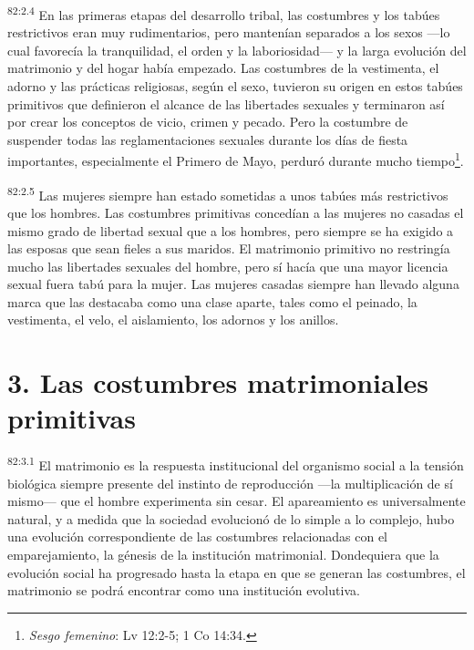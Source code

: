\documentclass[twoside, 11pt]{book}
\begin{document}
\par
\textsuperscript{82:2.4} En las primeras etapas del desarrollo tribal, las costumbres y los tabúes restrictivos eran muy rudimentarios, pero mantenían separados a los sexos ---lo cual favorecía la tranquilidad, el orden y la laboriosidad--- y la larga evolución del matrimonio y del hogar había empezado. Las costumbres de la vestimenta, el adorno y las prácticas religiosas, según el sexo, tuvieron su origen en estos tabúes primitivos que definieron el alcance de las libertades sexuales y terminaron así por crear los conceptos de vicio, crimen y pecado. Pero la costumbre de suspender todas las reglamentaciones sexuales durante los días de fiesta importantes, especialmente el Primero de Mayo, perduró durante mucho tiempo\footnote{\textit{Sesgo femenino}: Lv 12:2-5; 1 Co 14:34.}.

\par
\textsuperscript{82:2.5} Las mujeres siempre han estado sometidas a unos tabúes más restrictivos que los hombres. Las costumbres primitivas concedían a las mujeres no casadas el mismo grado de libertad sexual que a los hombres, pero siempre se ha exigido a las esposas que sean fieles a sus maridos. El matrimonio primitivo no restringía mucho las libertades sexuales del hombre, pero sí hacía que una mayor licencia sexual fuera tabú para la mujer. Las mujeres casadas siempre han llevado alguna marca que las destacaba como una clase aparte, tales como el peinado, la vestimenta, el velo, el aislamiento, los adornos y los anillos.

\section*{3. Las costumbres matrimoniales primitivas}
\par
\textsuperscript{82:3.1} El matrimonio es la respuesta institucional del organismo social a la tensión biológica siempre presente del instinto de reproducción ---la multiplicación de sí mismo--- que el hombre experimenta sin cesar. El apareamiento es universalmente natural, y a medida que la sociedad evolucionó de lo simple a lo complejo, hubo una evolución correspondiente de las costumbres relacionadas con el emparejamiento, la génesis de la institución matrimonial. Dondequiera que la evolución social ha progresado hasta la etapa en que se generan las costumbres, el matrimonio se podrá encontrar como una institución evolutiva.
\end{document}
